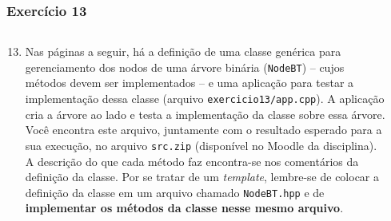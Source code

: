 \documentclass[aspectratio=169]{beamer}
\begin{document}
\begin{frame}[fragile]\frametitle{Exercício 13}
\begin{columns}[T]
\begin{column}{0.75\linewidth}
\begin{enumerate}
	\setcounter{enumi}{12}
	\small
	\item Nas páginas a seguir, há a definição de uma classe genérica para gerenciamento dos nodos de uma árvore binária (\texttt{NodeBT}) -- cujos métodos devem ser implementados -- e uma aplicação para testar a implementação dessa classe (arquivo \texttt{exercicio13/app.cpp}). A aplicação cria a árvore ao lado e testa a implementação da classe sobre essa árvore. Você encontra este arquivo, juntamente com o resultado esperado para a sua execução, no arquivo \texttt{src.zip} (disponível no Moodle da disciplina). A descrição do que cada método faz encontra-se nos comentários da definição da classe. Por se tratar de um \emph{template}, lembre-se de colocar a definição da classe em um arquivo chamado \texttt{NodeBT.hpp} e de \textbf{implementar os métodos da classe nesse mesmo arquivo}.
\end{enumerate}
\end{column}
\begin{column}{0.25\linewidth}
\vspace{-3mm}
\begin{figure}[h]
	\centering

\end{figure}
\end{column}
\end{columns}
\end{frame}
\end{document}
